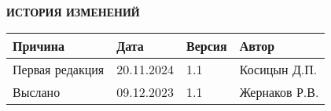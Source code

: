 	\begin{center}
		\large \textbf{ИСТОРИЯ ИЗМЕНЕНИЙ} \normalsize
	\end{center}
\begin{longtable}{|p{70mm}|p{20mm}|p{20mm}|p{50mm}|}
\hline
{\bf \parbox[c][5mm]{70mm}{\centering Причина}} & {\bf \parbox[c]{20mm}{\centering Дата}} & {\bf \parbox[c]{20mm}{\centering Версия}} & {\bf \parbox[c]{50mm}{\centering Автор}} \\
\hline
\parbox[c][9mm]{70mm}{Первая редакция} & {\parbox{20mm}{20.11.2024}} & \parbox{20mm}{1.1} & {\parbox{50mm}{Косицын Д.П.}} \\
\hline
\parbox[c][9mm]{70mm}{Выслано} & {\parbox{20mm}{09.12.2023}} & \parbox{20mm}{1.1} & {\parbox{50mm}{Жернаков Р.В.}} \\
\hline
\end{longtable}  
	
\newpage